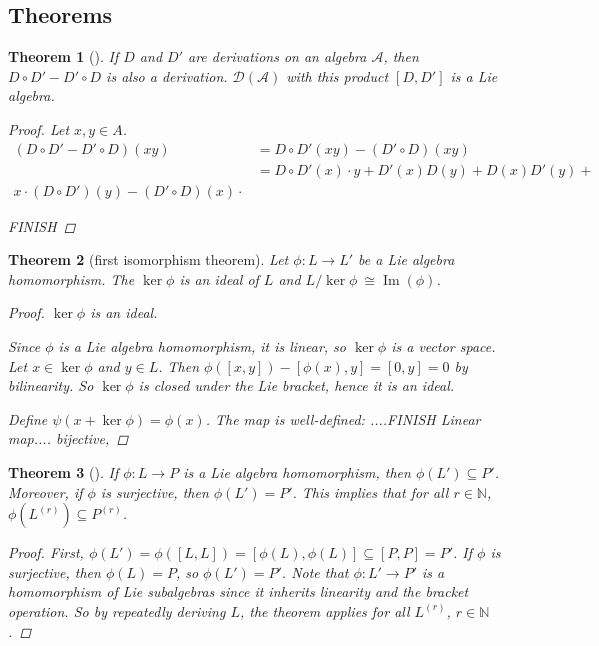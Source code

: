 \documentclass[letterpaper, 10pt]{article}
\theoremstyle{theostyle}
\newtheorem{theorem}{Theorem}[section]
\newenvironment{thmstyle}[1][]{%
    \begin{theorem}[#1]\leavevmode\vspace{-\baselineskip}\myquote%
    }{\endmyquote\end{theorem}}
\begin{document}
\subsection{Theorems}

\begin{thmstyle}
    If \(D\) and \(D'\) are derivations on an algebra \(\mathcal{A}\), then \(D \circ D' - D' \circ D\) is also a derivation.
    \(\mathcal{D}(\mathcal{A})\) with this product \([D, D']\) is a Lie algebra.

    \begin{proof}
        Let \(x, y \in A\).
        \begin{align*}
            (D \circ D' - D' \circ D)(xy) &= D \circ D'(xy) - (D' \circ D)(xy) \\
            &= D \circ D'(x) \cdot y + D'(x) D(y) + D(x)D'(y) + \\
            x \cdot (D \circ D')(y) - (D' \circ D)(x) \cdot
        \end{align*}

        FINISH
    \end{proof}
\end{thmstyle}

\begin{thmstyle}[first isomorphism theorem]
    Let \(\phi: L \rightarrow L'\) be a Lie algebra homomorphism.
    The \(\ker{\phi}\) is an ideal of \(L\) and \(L / \ker{\phi}\ \cong \operatorname{Im}{(\phi)}\).
    
    \begin{proof}
        \(\ker{\phi}\) is an ideal.

        Since \(\phi\) is a Lie algebra homomorphism, it is linear, so \(\ker{\phi}\) is a vector space.
        Let \(x \in \ker{\phi}\) and \(y \in L\).
        Then \(\phi([x,y]) - [\phi(x), y] = [0,y] = 0\) by bilinearity.
        So \(\ker{\phi}\) is closed under the Lie bracket, hence it is an ideal.

        Define \(\psi(x + \ker{\phi}) = \phi(x)\).
        The map is well-defined:
        ....FINISH
        Linear map....
        bijective,
    
    \end{proof}
\end{thmstyle}

\begin{thmstyle}
    If \(\phi:L \rightarrow P\) is a Lie algebra homomorphism, then \(\phi(L') \subseteq P'\).
    Moreover, if \(\phi\) is surjective, then \(\phi(L') = P'\).
    This implies that for all \(r \in \mathbb{N}\), \(\phi\left(L^{(r)}\right) \subseteq P^{(r)}\).

    \begin{proof}
        First, \(\phi(L') = \phi([L,L]) = [\phi(L),\phi(L)] \subseteq [P, P] = P'\).
        If \(\phi\) is surjective, then \(\phi(L) = P\), so \(\phi(L') = P'\).
        Note that \(\phi:L' \rightarrow P'\) is a homomorphism of Lie subalgebras since it inherits linearity and the bracket operation.
        So by repeatedly deriving \(L\), the theorem applies for all \(L^{(r)}\), \(r \in \mathbb{N}\).
    \end{proof}
\end{thmstyle}
\end{document}
